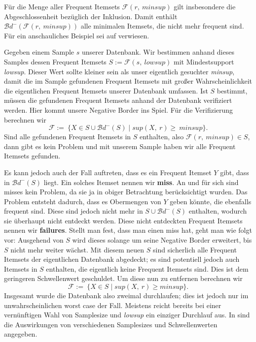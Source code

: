 Für die Menge aller Frequent Itemsets \(\mathcal{F}(r,\ minsup)\) gilt insbesondere
die Abgeschlossenheit bezüglich der Inklusion. Damit enthält \(\mathcal{B}d^{-}
(\mathcal{F}(r,\ minsup))\) alle minimalen Itemsets, die nicht mehr frequent sind.
Für ein anschauliches Beispiel sei auf \citet{Toi96} verwiesen.

Gegeben einem Sample \(s\) unserer Datenbank. Wir bestimmen anhand dieses Samples dessen
Frequent Itemsets \(S:=\mathcal{F}(s,\ lowsup)\) mit Mindestsupport \textit{lowsup}.
Dieser Wert sollte kleiner sein als unser eigentlich gesuchter \textit{minsup}, damit
die im Sample gefundenen Frequent Itemsets mit großer Wahrscheinlichkeit die
eigentlichen Frequent Itemsets unserer Datenbank umfassen. Ist \(S\) bestimmt,
müssen die gefundenen Frequent Itemsets anhand der Datenbank verifiziert werden.
Hier kommt unsere Negative Border ins Spiel. Für die Verifizierung berechnen wir
\[\mathcal{F}:=\ \{X\in S\cup \mathcal{B}d^{-}(S) \mid sup(X,\ r) \geq\ minsup\}.\]
Sind alle gefundenen Frequent Itemsets in \(S\) enthalten, also \(\mathcal{F}(r,\ 
minsup) \in S\), dann gibt es kein Problem und mit unserem Sample haben wir alle
Frequent Itemsets gefunden.

Es kann jedoch auch der Fall auftreten, dass es ein Frequent Itemset \(Y\) gibt,
dass in \(\mathcal{B}d^{-}(S)\) liegt. Ein solches Itemset nennen wir \textbf{miss}.
An und für sich sind misses kein Problem, da sie ja in obiger Betrachtung berücksichtigt
wurden. Das Problem entsteht dadurch, dass es Obermengen von \(Y\) geben könnte, die 
ebenfalls frequent sind. Diese sind jedoch nicht mehr in \(S\cup \mathcal{B}d^{-}(S)\)
enthalten, wodurch sie überhaupt nicht entdeckt werden. Diese nicht entdeckten 
Frequent Itemsets nennen wir \textbf{failures}. Stellt man fest, dass man einen
miss hat, geht man wie folgt vor: Ausgehend von \(S\) wird dieses solange um seine
Negative Border erweitert, bis \(S\) nicht mehr weiter wächst. Mit diesem neuen \(S\)
sind sicherlich alle Frequent Itemsets der eigentlichen Datenbank abgedeckt; es sind
potentiell jedoch auch Itemsets in \(S\) enthalten, die eigentlich keine Frequent
Itemsets sind. Dies ist dem geringeren Schwellenwert geschuldet. Um diese nun zu 
entfernen berechnen wir 
\[\mathcal{F}:=\ \{X\in S \mid sup(X,\ r)\geq minsup\}.\]
Insgesamt wurde die Datenbank also zweimal durchlaufen; dies ist jedoch nur im
unwahrscheinlichen worst case der Fall. Meistens reicht bereits bei einer vernünftigen
Wahl von Samplesize und \textit{lowsup} ein einziger Durchlauf aus. In \citet{Toi96}
sind die Auswirkungen von verschiedenen Samplesizes und Schwellenwerten angegeben.

